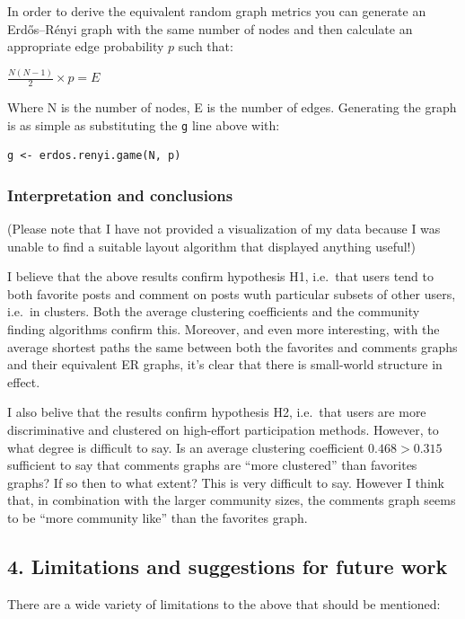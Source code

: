 In order to derive the equivalent random graph metrics you can generate
an Erdős--Rényi graph with the same number of nodes and then calculate
an appropriate edge probability $p$ such that:

$\frac{N(N-1)}{2} \times p = E$

Where N is the number of nodes, E is the number of edges. Generating the
graph is as simple as substituting the \texttt{g} line above with:

\begin{verbatim}
g <- erdos.renyi.game(N, p)
\end{verbatim}

\subsubsection{Interpretation and conclusions}

(Please note that I have not provided a visualization of my data because
I was unable to find a suitable layout algorithm that displayed anything
useful!)

I believe that the above results confirm hypothesis H1, i.e.~that users
tend to both favorite posts and comment on posts wuth particular subsets
of other users, i.e.~in clusters. Both the average clustering
coefficients and the community finding algorithms confirm this.
Moreover, and even more interesting, with the average shortest paths the
same between both the favorites and comments graphs and their equivalent
ER graphs, it's clear that there is small-world structure in effect.

I also belive that the results confirm hypothesis H2, i.e.~that users
are more discriminative and clustered on high-effort participation
methods. However, to what degree is difficult to say. Is an average
clustering coefficient $0.468 > 0.315$ sufficient to say that comments
graphs are ``more clustered'' than favorites graphs? If so then to what
extent? This is very difficult to say. However I think that, in
combination with the larger community sizes, the comments graph seems to
be ``more community like'' than the favorites graph.

\subsection{4. Limitations and suggestions for future work}

There are a wide variety of limitations to the above that should be
mentioned:

